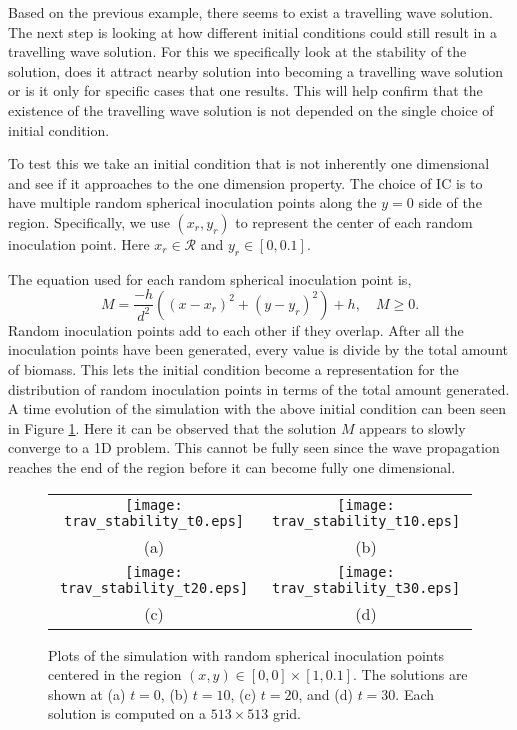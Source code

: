 Based on the previous example, there seems to exist a travelling wave solution. %
The next step is looking at how different initial conditions could still result in a travelling wave solution.
For this we specifically look at the stability of the solution, does it attract nearby solution into becoming a travelling wave solution or is it only for specific cases that one results.
This will help confirm that the existence of the travelling wave solution is not depended on the single choice of initial condition.

To test this we take an initial condition that is not inherently one dimensional and see if it approaches to the one dimension property.
The choice of IC is to have multiple random spherical inoculation points along the $y=0$ side of the region.
Specifically, we use $(x_r, y_r)$ to represent the center of each random inoculation point.
Here $x_r \in \mathcal{R}$ and $y_r \in [0, 0.1]$.

The equation used for each random spherical inoculation point is,
\begin{equation}
  M = \frac{-h}{d^2} \left( (x - x_r)^2 + (y - y_r)^2 \right) + h, \quad M \ge  0.
\end{equation}
Random inoculation points add to each other if they overlap.
After all the inoculation points have been generated, every value is divide by the total amount of biomass.
This lets the initial condition become a representation for the distribution of random inoculation points in terms of the total amount generated.
A time evolution of the simulation with the above initial condition can been seen in Figure \ref{fig:trav_stability}.
Here it can be observed that the solution $M$ appears to slowly converge to a 1D problem.
This cannot be fully seen since the wave propagation reaches the end of the region before it can become fully one dimensional.

\begin{figure}[!htp]
  \centering
  \begin{tabular}{c c}
      \texttt{[image: trav\_stability\_t0.eps]} &
      \texttt{[image: trav\_stability\_t10.eps]} \\
      (a) & (b) \\
      \texttt{[image: trav\_stability\_t20.eps]} &
      \texttt{[image: trav\_stability\_t30.eps]} \\
      (c) & (d) 
  \end{tabular}
  \caption{Plots of the simulation with random spherical inoculation points centered in the region $(x,y) \in [0,0] \times [1,0.1]$.
    The solutions are shown at (a) $t = 0$, (b) $t = 10$, (c) $t = 20$, and (d) $t = 30$.
    Each solution is computed on a $513 \times 513$ grid. }
  \label{fig:trav_stability}
\end{figure}


